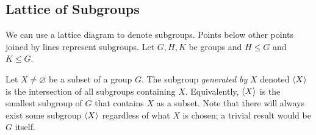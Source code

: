 \subsection{Lattice of Subgroups}
We can use a lattice diagram to denote subgroups.
Points below other points joined by lines represent subgroups.
Let \(G, H, K\) be groups and \(H \leq G\) and \(K \leq G\).


\begin{definition}
	Let \(X \neq \varnothing\) be a subset of a group \(G\).
	The subgroup \textit{generated by} \(X\) denoted \(\langle{} X \rangle\) is the intersection of all subgroups containing \(X\).
	Equivalently, \(\langle{} X \rangle\) is the smallest subgroup of \(G\) that contains \(X\) as a subset.
	Note that there will always exist some subgroup \(\langle{} X \rangle\) regardless of what \(X\) is chosen; a trivial result would be \(G\) itself.
\end{definition}
